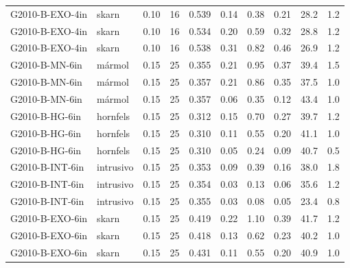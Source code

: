\documentclass[11pt,letterpaper]{article}
\begin{document}
\begin{footnotesize}
\begin{longtable}{L{3.6cm}L{2.2cm}rrrrrrrr}
G2010-B-EXO-4in & skarn & 0.10 & 16 & 0.539 & 0.14 & 0.38 & 0.21 & 28.2 & 1.2 \\
G2010-B-EXO-4in & skarn & 0.10 & 16 & 0.534 & 0.20 & 0.59 & 0.32 & 28.8 & 1.2 \\
G2010-B-EXO-4in & skarn & 0.10 & 16 & 0.538 & 0.31 & 0.82 & 0.46 & 26.9 & 1.2 \\
G2010-B-MN-6in & mármol & 0.15 & 25 & 0.355 & 0.21 & 0.95 & 0.37 & 39.4 & 1.5 \\
G2010-B-MN-6in & mármol & 0.15 & 25 & 0.357 & 0.21 & 0.86 & 0.35 & 37.5 & 1.0 \\
G2010-B-MN-6in & mármol & 0.15 & 25 & 0.357 & 0.06 & 0.35 & 0.12 & 43.4 & 1.0 \\
G2010-B-HG-6in & hornfels & 0.15 & 25 & 0.312 & 0.15 & 0.70 & 0.27 & 39.7 & 1.2 \\
G2010-B-HG-6in & hornfels & 0.15 & 25 & 0.310 & 0.11 & 0.55 & 0.20 & 41.1 & 1.0 \\
G2010-B-HG-6in & hornfels & 0.15 & 25 & 0.310 & 0.05 & 0.24 & 0.09 & 40.7 & 0.5 \\
G2010-B-INT-6in & intrusivo & 0.15 & 25 & 0.353 & 0.09 & 0.39 & 0.16 & 38.0 & 1.8 \\
G2010-B-INT-6in & intrusivo & 0.15 & 25 & 0.354 & 0.03 & 0.13 & 0.06 & 35.6 & 1.2 \\
G2010-B-INT-6in & intrusivo & 0.15 & 25 & 0.355 & 0.03 & 0.08 & 0.05 & 23.4 & 0.8 \\
G2010-B-EXO-6in & skarn & 0.15 & 25 & 0.419 & 0.22 & 1.10 & 0.39 & 41.7 & 1.2 \\
G2010-B-EXO-6in & skarn & 0.15 & 25 & 0.418 & 0.13 & 0.62 & 0.23 & 40.2 & 1.0 \\
G2010-B-EXO-6in & skarn & 0.15 & 25 & 0.431 & 0.11 & 0.55 & 0.20 & 40.9 & 1.0 \\
\bottomrule
\end{longtable}\end{footnotesize}
\end{document}
